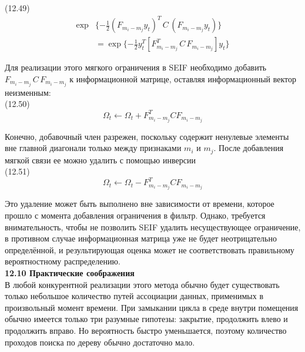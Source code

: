 \documentclass[10pt,a4paper]{article}
\begin{document}
(12.49)
\begin{equation*}
\begin{split}
\exp&\{-\frac{1}{2}(F_{m_i-m_j}y_t)^T\,C\,(F_{m_i-m_j}y_t)\}\\
&=\exp\{-\frac{1}{2}y_t^T[F_{m_i-m_j}^T\,C\,F_{m_i-m_j}]y_t\}
\end{split}
\end{equation*}

Для реализации этого мягкого ограничения в SEIF необходимо добавить $F_{m_i-m_j}\,C\,F_{m_i-m_j}$ к информационной матрице, оставляя информационный вектор неизменным:\\

(12.50)
$$\varOmega_t\longleftarrow\varOmega_t+F_{m_i-m_j}^TCF_{m_i-m_j}$$

Конечно, добавочный член разрежен, поскольку содержит ненулевые элементы вне главной диагонали только между признаками $m_i$ и $m_j$. После добавления мягкой связи ее можно удалить с помощью инверсии\\

(12.51)
$$\varOmega_t\longleftarrow\varOmega_t-F_{m_i-m_j}^TCF_{m_i-m_j}$$

Это удаление может быть выполнено вне зависимости от времени, которое прошло с момента добавления ограничения в фильтр. Однако, требуется внимательность, чтобы не позволить SEIF удалить несуществующее ограничение, в противном случае информационная матрица уже не будет неотрицательно определённой, и результирующая оценка может не соответствовать правильному вероятностному распределению.\\

\textbf{12.10	Практические соображения}\\

В любой конкурентной реализации этого метода обычно будет существовать только небольшое количество путей ассоциации данных, применимых в произвольный момент времени. При замыкании цикла в среде внутри помещения обычно имеется только три разумные гипотезы: закрытие, продолжить влево и продолжить вправо. Но вероятность быстро уменьшается, поэтому количество проходов поиска по дереву обычно достаточно мало. 
\end{document}
